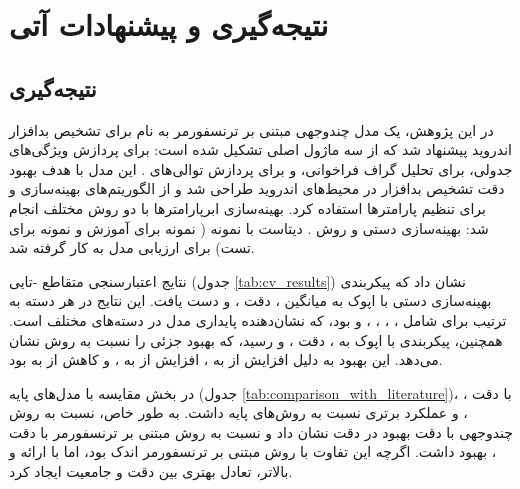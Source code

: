 \clearpage
\thispagestyle{empty}
\chapter{نتیجه‌گیری و پیشنهادات آتی}\label{chap6}

\section{نتیجه‌گیری}
در این پژوهش، یک مدل چندوجهی مبتنی بر ترنسفورمر به نام  برای تشخیص بدافزار اندروید پیشنهاد شد که از سه ماژول اصلی تشکیل شده است:  برای پردازش ویژگی‌های جدولی،  برای تحلیل گراف فراخوانی، و  برای پردازش توالی‌های . این مدل با هدف بهبود دقت تشخیص بدافزار در محیط‌های اندروید طراحی شد و از الگوریتم‌های بهینه‌سازی  و  برای تنظیم پارامترها استفاده کرد. بهینه‌سازی ابرپارامترها با دو روش مختلف انجام شد: بهینه‌سازی دستی و روش  \cite{Optuna2019}. دیتاست  \cite{Drebin} با  نمونه ( نمونه برای آموزش و  نمونه برای تست) برای ارزیابی مدل به کار گرفته شد.

نتایج اعتبارسنجی متقاطع -تایی (جدول \ref{tab:cv_results}) نشان داد که پیکربندی بهینه‌سازی دستی با  اپوک به میانگین  ، دقت ، و   دست یافت. این نتایج در هر دسته به ترتیب برای  شامل ، ، ، ، و  بود، که نشان‌دهنده پایداری مدل در دسته‌های مختلف است. همچنین، پیکربندی  با  اپوک به  ، دقت ، و   رسید، که بهبود جزئی را نسبت به روش  نشان می‌دهد. این بهبود به دلیل افزایش  از  به ، افزایش  از  به ، و کاهش  از  به  بود.

در بخش مقایسه با مدل‌های پایه (جدول \ref{tab:comparison_with_literature})،  با دقت ،  ، و   عملکرد برتری نسبت به روش‌های پایه داشت. به طور خاص،  نسبت به روش چندوجهی \cite{Alsaleh2023} با دقت  بهبود  در دقت نشان داد و نسبت به روش مبتنی بر ترنسفورمر \cite{TransformerMalware} با دقت ، بهبود  داشت. اگرچه این تفاوت با روش مبتنی بر ترنسفورمر اندک بود، اما  با ارائه  و  بالاتر، تعادل بهتری بین دقت و جامعیت ایجاد کرد.

